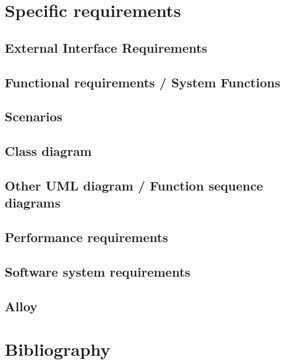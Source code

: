 \documentclass[12pt, a4paper]{article}
\begin{document}
\newpage
\section{Specific requirements}
	\subsection{External Interface Requirements}
	
	\subsection{Functional requirements / System Functions}
	
	
	\subsection{Scenarios}
	
	
	\subsection{Class diagram}
	
	\subsection{Other UML diagram / Function sequence diagrams}

	\subsection{Performance requirements}
	
	\subsection{Software system requirements}
	
	\subsection{Alloy}


\newpage
\section{Bibliography}
\end{document}
